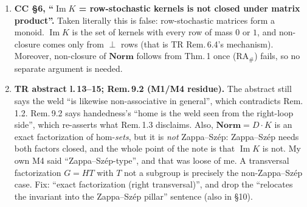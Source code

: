 \documentclass[11pt]{article}
\newcommand{\Norm}{\mathbf{Norm}}
\renewcommand{\Im}{\operatorname{Im}}
\begin{document}
\begin{enumerate}[label=\textbf{S\arabic*.},leftmargin=*]
  In $C_2\times C_2$, 8/8 transversals are subgroups; in $D_4$ with $H=\langle r\rangle$, 4/4 are. The
  precise statement: $T$ is a subgroup iff $T$ is a complement of $H$. So for normal non-split $H$
  \emph{no} transversal is a subgroup (your three examples), and for split $H$ exactly the complements are.
\item \textbf{CC \S6, ``$\Im K$ = row-stochastic kernels is not closed under matrix product''.}
  Taken literally this is false: row-stochastic matrices form a monoid. $\Im K$ is the set of kernels with every row of
  mass $0$ or $1$, and non-closure comes only from $\perp$ rows (that is TR Rem.\,6.4's mechanism). Moreover,
  non-closure of $\Norm$ follows from Thm.\,1 once (RA$_\#$) fails, so no separate argument is needed.
\item \textbf{TR abstract l.\,13--15; Rem.\,9.2 (M1/M4 residue).} The abstract still says the weld
  ``is likewise non-associative in general'', which contradicts Rem.\,1.2. Rem.\,9.2 says handedness's
  ``home is the weld seen from the right-loop side'', which re-asserts what Rem.\,1.3 disclaims. Also,
  $\Norm=D\cdot K$ is an exact factorization of hom-\emph{sets}, but it is \emph{not} Zappa--Sz\'ep:
  Zappa--Sz\'ep needs both factors closed, and the whole point of the note is that $\Im K$ is not.
  My own M4 said ``Zappa--Sz\'ep-type'', and that was loose of me. A transversal factorization $G=HT$ with
  $T$ not a subgroup is precisely the non-Zappa--Sz\'ep case. Fix: ``exact factorization (right
  transversal)'', and drop the ``relocates the invariant into the Zappa--Sz\'ep pillar'' sentence (also in \S10).
\end{enumerate}
\end{document}
